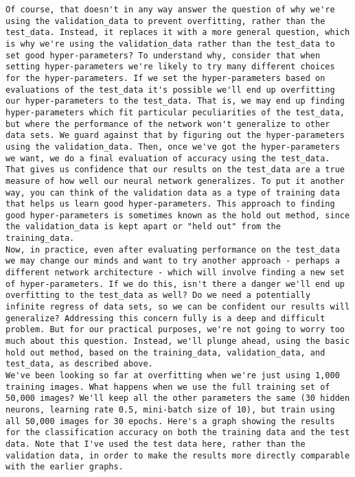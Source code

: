 \begin{lstlisting}
Of course, that doesn't in any way answer the question of why we're using the validation_data to prevent overfitting, rather than the test_data. Instead, it replaces it with a more general question, which is why we're using the validation_data rather than the test_data to set good hyper-parameters? To understand why, consider that when setting hyper-parameters we're likely to try many different choices for the hyper-parameters. If we set the hyper-parameters based on evaluations of the test_data it's possible we'll end up overfitting our hyper-parameters to the test_data. That is, we may end up finding hyper-parameters which fit particular peculiarities of the test_data, but where the performance of the network won't generalize to other data sets. We guard against that by figuring out the hyper-parameters using the validation_data. Then, once we've got the hyper-parameters we want, we do a final evaluation of accuracy using the test_data. That gives us confidence that our results on the test_data are a true measure of how well our neural network generalizes. To put it another way, you can think of the validation data as a type of training data that helps us learn good hyper-parameters. This approach to finding good hyper-parameters is sometimes known as the hold out method, since the validation_data is kept apart or "held out" from the training_data.
Now, in practice, even after evaluating performance on the test_data we may change our minds and want to try another approach - perhaps a different network architecture - which will involve finding a new set of hyper-parameters. If we do this, isn't there a danger we'll end up overfitting to the test_data as well? Do we need a potentially infinite regress of data sets, so we can be confident our results will generalize? Addressing this concern fully is a deep and difficult problem. But for our practical purposes, we're not going to worry too much about this question. Instead, we'll plunge ahead, using the basic hold out method, based on the training_data, validation_data, and test_data, as described above.
We've been looking so far at overfitting when we're just using 1,000 training images. What happens when we use the full training set of 50,000 images? We'll keep all the other parameters the same (30 hidden neurons, learning rate 0.5, mini-batch size of 10), but train using all 50,000 images for 30 epochs. Here's a graph showing the results for the classification accuracy on both the training data and the test data. Note that I've used the test data here, rather than the validation data, in order to make the results more directly comparable with the earlier graphs.


\end{lstlisting}
